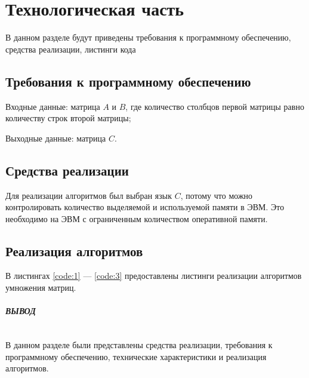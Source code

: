 \chapter{Технологическая часть}
В данном разделе будут приведены требования к программному обеспечению,
средства реализации, листинги кода




\section{Требования к программному обеспечению}

Входные данные: матрица $A$ и  $B$, где количество столбцов первой матрицы равно количеству
строк второй матрицы;

Выходные данные: матрица $C$.




\section{Средства реализации}

Для реализации алгоритмов был выбран язык $C$, потому что
можно контролировать количество выделяемой и используемой памяти
в ЭВМ. Это необходимо на ЭВМ с ограниченным количеством оперативной памяти.

\section{Реализация алгоритмов}

В листингах \ref{code:1} --- \ref{code:3} предоставлены листинги реализации
алгоритмов умножения матриц.

\begin{center}
\captionsetup{justification=raggedright,singlelinecheck=off}

\end{center}



\begin{center}
\captionsetup{justification=raggedright,singlelinecheck=off}

\end{center}



\begin{center}
\captionsetup{justification=raggedright,singlelinecheck=off}

\end{center}

\clearpage

\paragraph*{ВЫВОД} ${}$ \newline

В данном разделе были представлены средства реализации, требования к программному обеспечению,
технические характеристики и реализация алгоритмов.


